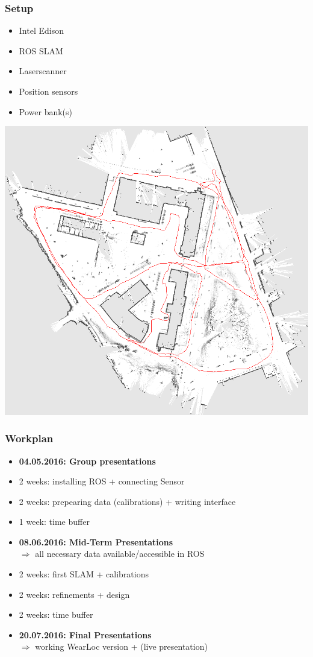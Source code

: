 \documentclass{beamer}
\begin{document}
\begin{frame}
\frametitle{Setup}
\begin{minipage}[l]{0.5\textwidth}
\begin{itemize}
\item Intel Edison
\item ROS SLAM
\item Laserscanner
\item Position sensors
\item Power bank(s)
\end{itemize}
\end{minipage}
\begin{minipage}[r]{0.4\textwidth}
  \includegraphics[width=1\textwidth]{slam.png} 
\end{minipage}
\end{frame}

\begin{frame}
\frametitle{Workplan}
\begin{itemize}
\item \textbf{04.05.2016: Group presentations}
\item 2 weeks: installing ROS + connecting Sensor
\item 2 weeks: prepearing data (calibrations) + writing interface
\item 1 week: time buffer 
\item \textbf{08.06.2016: Mid-Term Presentations} \\
$\Rightarrow$ all necessary data available/accessible in ROS
\item 2 weeks: first SLAM + calibrations
\item 2 weeks: refinements + design
\item 2 weeks: time buffer
\item \textbf{20.07.2016: Final Presentations} \\
$\Rightarrow$ working WearLoc version + (live presentation) 
\end{itemize}
\end{frame}
\end{document}
